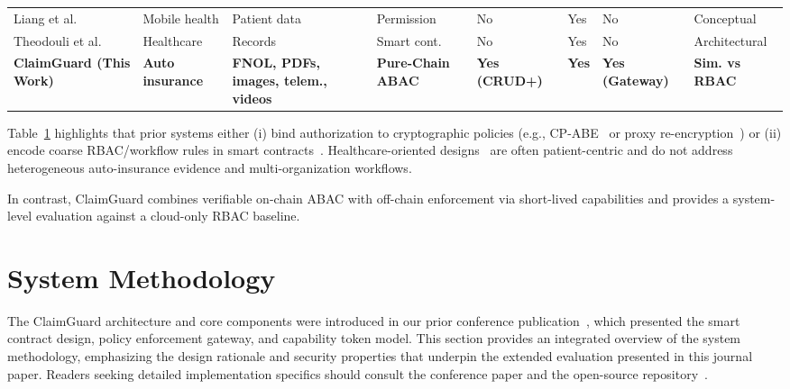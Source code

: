 \documentclass[final,5p,times,twocolumn]{elsarticle}
\begin{document}
\begin{table}[!htbp]
\begin{tabular}{@{}p{2.8cm}p{2cm}p{2.2cm}p{2cm}p{1.8cm}p{1.5cm}p{1.5cm}p{2cm}@{}}
		\addlinespace[0.5ex]
		Liang et al.~\cite{liang2017mhealth}            & Mobile health           & Patient data                                & Permission               & No                    & Yes                        & No                          & Conceptual            \\
		\addlinespace[0.5ex]
		Theodouli et al.~\cite{theodouli2018healthcare} & Healthcare              & Records                                     & Smart cont.              & No                    & Yes                        & No                          & Architectural         \\
		\midrule
		\textbf{ClaimGuard (This Work)}                 & \textbf{Auto insurance} & \textbf{FNOL, PDFs, images, telem., videos} & \textbf{Pure-Chain ABAC} & \textbf{Yes (CRUD+)}  & \textbf{Yes}               & \textbf{Yes (Gateway)}      & \textbf{Sim. vs RBAC} \\
		\bottomrule
	\end{tabular}
	\label{tab:comparison}
\end{table}

Table~\ref{tab:comparison} highlights that prior systems either (i) bind authorization to cryptographic policies (e.g., CP-ABE~\cite{sun2020insurance} or proxy re-encryption~\cite{liu2021auto}) or (ii) encode coarse RBAC/workflow rules in smart contracts~\cite{raikwar2018insurance, tekale2023claims}. Healthcare-oriented designs~\cite{sun2020emr, rana2022healthcare, liang2017mhealth, theodouli2018healthcare} are often patient-centric and do not address heterogeneous auto-insurance evidence and multi-organization workflows.

In contrast, ClaimGuard combines verifiable on-chain ABAC with off-chain enforcement via short-lived capabilities and provides a system-level evaluation against a cloud-only RBAC baseline.


\section{System Methodology}

The ClaimGuard architecture and core components were introduced in our prior conference publication~\cite{eneh2025claimguard}, which presented the smart contract design, policy enforcement gateway, and capability token model. This section provides an integrated overview of the system methodology, emphasizing the design rationale and security properties that underpin the extended evaluation presented in this journal paper. Readers seeking detailed implementation specifics should consult the conference paper and the open-source repository~\cite{claimguard-repo}.
\end{document}
